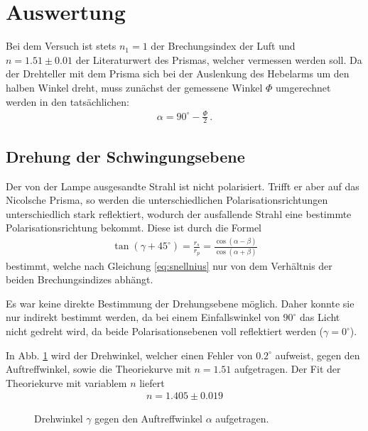 \documentclass[12pt,a4paper,titlepage,headinclude,bibtotoc]{scrartcl}
\begin{document}
\section{Auswertung}
\label{sec:auswertung}
Bei dem Versuch ist stets $n_1 =1$ der Brechungsindex der Luft und $n=1.51\pm 0.01$ der Literaturwert des Prismas, welcher vermessen werden soll.
Da der Drehteller mit dem Prisma sich bei der Auslenkung des Hebelarms um den halben Winkel dreht, muss zunächst der gemessene Winkel $\Phi$ umgerechnet werden in den tatsächlichen:
\begin{align*}
	\alpha = 90^\circ - \frac{\Phi}{2}\, .
\end{align*}

\subsection{Drehung der Schwingungsebene}
Der von der Lampe ausgesandte Strahl ist nicht polarisiert.
Trifft er aber auf das Nicolsche Prisma, so werden die unterschiedlichen Polarisationsrichtungen unterschiedlich stark reflektiert, wodurch der ausfallende Strahl eine bestimmte Polarisationsrichtung bekommt.
Diese ist durch die Formel 
\begin{align}
	\tan (\gamma +45^\circ)=\frac{r_s}{r_p}=\frac{\cos(\alpha-\beta)}{\cos (\alpha +\beta)}\label{eq:drehung}
\end{align}
bestimmt, welche nach Gleichung \ref{eq:snellnius} nur von dem Verhältnis der beiden Brechungsindizes abhängt.

Es war keine direkte Bestimmung der Drehungsebene möglich.
Daher konnte sie nur indirekt bestimmt werden, da bei einem Einfallswinkel von $90^\circ$ das Licht nicht gedreht wird, da beide Polarisationsebenen voll reflektiert werden ($\gamma=0^\circ$).

In Abb. \ref{fig:drehung} wird der Drehwinkel, welcher einen Fehler von $0.2^\circ$ aufweist, gegen den Auftreffwinkel, sowie die Theoriekurve mit $n=1.51$ aufgetragen.
Der Fit der Theoriekurve mit variablem $n$ liefert
\begin{align*}
	n=1.405\pm 0.019
\end{align*}
\begin{figure}[h]
	\centering
	
	\caption{Drehwinkel $\gamma$ gegen den Auftreffwinkel $\alpha$ aufgetragen.}
	\label{fig:drehung}
\end{figure}
\end{document}
